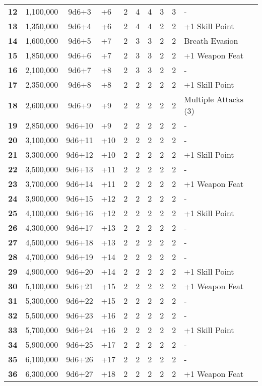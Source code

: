 \begin {table}[H]
\begin{tabularx}{\columnwidth}{>{\bfseries}cccM{.31in}M{.51in}M{.25in}M{.43in}M{.32in}M{.45in}Y}
		12 & 1,100,000 & 9d6+3 & +6 & 2 & 4 & 4 & 3 & 3 & -\\
		13 & 1,350,000 & 9d6+4 & +6 & 2 & 4 & 4 & 2 & 2 & +1 Skill Point\\
		14 & 1,600,000 & 9d6+5 & +7 & 2 & 3 & 3 & 2 & 2 & Breath Evasion\\
		15 & 1,850,000 & 9d6+6 & +7 & 2 & 3 & 3 & 2 & 2 & +1 Weapon Feat\\
		16 & 2,100,000 & 9d6+7 & +8 & 2 & 3 & 3 & 2 & 2 & -\\
		17 & 2,350,000 & 9d6+8 & +8 & 2 & 2 & 2 & 2 & 2 & +1 Skill Point\\
		18 & 2,600,000 & 9d6+9 & +9 & 2 & 2 & 2 & 2 & 2 & Multiple Attacks (3)\\
		19 & 2,850,000 & 9d6+10 & +9 & 2 & 2 & 2 & 2 & 2 & -\\
		20 & 3,100,000 & 9d6+11 & +10 & 2 & 2 & 2 & 2 & 2 & -\\
		21 & 3,300,000 & 9d6+12 & +10 & 2 & 2 & 2 & 2 & 2 & +1 Skill Point\\
		22 & 3,500,000 & 9d6+13 & +11 & 2 & 2 & 2 & 2 & 2 & -\\
		23 & 3,700,000 & 9d6+14 & +11 & 2 & 2 & 2 & 2 & 2 & +1 Weapon Feat\\
		24 & 3,900,000 & 9d6+15 & +12 & 2 & 2 & 2 & 2 & 2 & -\\
		25 & 4,100,000 & 9d6+16 & +12 & 2 & 2 & 2 & 2 & 2 & +1 Skill Point\\
		26 & 4,300,000 & 9d6+17 & +13 & 2 & 2 & 2 & 2 & 2 & -\\
		27 & 4,500,000 & 9d6+18 & +13 & 2 & 2 & 2 & 2 & 2 & -\\
		28 & 4,700,000 & 9d6+19 & +14 & 2 & 2 & 2 & 2 & 2 & -\\
		29 & 4,900,000 & 9d6+20 & +14 & 2 & 2 & 2 & 2 & 2 & +1 Skill Point\\
		30 & 5,100,000 & 9d6+21 & +15 & 2 & 2 & 2 & 2 & 2 & +1 Weapon Feat\\
		31 & 5,300,000 & 9d6+22 & +15 & 2 & 2 & 2 & 2 & 2 & -\\
		32 & 5,500,000 & 9d6+23 & +16 & 2 & 2 & 2 & 2 & 2 & -\\
		33 & 5,700,000 & 9d6+24 & +16 & 2 & 2 & 2 & 2 & 2 & +1 Skill Point\\
		34 & 5,900,000 & 9d6+25 & +17 & 2 & 2 & 2 & 2 & 2 & -\\
		35 & 6,100,000 & 9d6+26 & +17 & 2 & 2 & 2 & 2 & 2 & -\\
		36 & 6,300,000 & 9d6+27 & +18 & 2 & 2 & 2 & 2 & 2 & +1 Weapon Feat\
  \end {tabularx}
\end {table}

